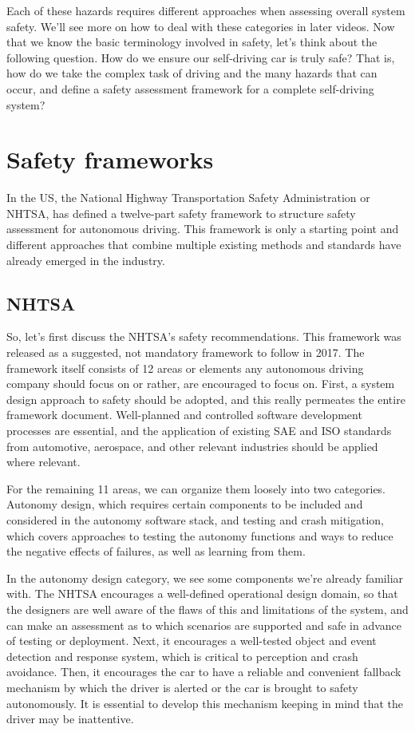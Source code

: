 Each of these hazards requires different approaches when assessing overall system safety. 
We'll see more on how to deal with these categories in later videos. 
Now that we know the basic terminology involved in safety, let's think about the following question. 
How do we ensure our self-driving car is truly safe? 
That is, how do we take the complex task of driving and the many hazards that can occur, and define a 
safety assessment framework for a complete self-driving system? 

\section{Safety frameworks}
In the US, the National Highway Transportation Safety Administration or NHTSA, has defined a twelve-part safety framework 
to structure safety assessment for autonomous driving. This framework is only a starting point and different approaches that combine 
multiple existing methods and standards have already emerged in the industry. 

\subsection{NHTSA}
So, let's first discuss the NHTSA's safety recommendations. 
This framework was released as a suggested, not mandatory framework to follow in 2017. 
The framework itself consists of 12 areas or elements any autonomous driving company should focus 
on or rather, are encouraged to focus on. First, a system design approach to safety should be adopted, 
and this really permeates the entire framework document. 
Well-planned and controlled software development processes are essential, and the application 
of existing SAE and ISO standards from automotive, aerospace, and other relevant industries should be applied where relevant. 

For the remaining 11 areas, we can organize them loosely into two categories. Autonomy design, which requires certain components to be included and considered 
in the autonomy software stack, and testing and crash mitigation, which covers approaches to testing 
the autonomy functions and ways to reduce the negative effects of failures, 
as well as learning from them. 

In the autonomy design category, we see some components we're already familiar with. 
The NHTSA encourages a well-defined operational design domain, so that the designers are well aware of 
the flaws of this and limitations of the system, and can make an assessment as to which scenarios are 
supported and safe in advance of testing or deployment. Next, it encourages a well-tested object and event 
detection and response system, which is critical to perception and crash avoidance. 
Then, it encourages the car to have a reliable and convenient fallback mechanism by which 
the driver is alerted or the car is brought to safety autonomously. 
It is essential to develop this mechanism keeping in mind that the driver may be inattentive. 

